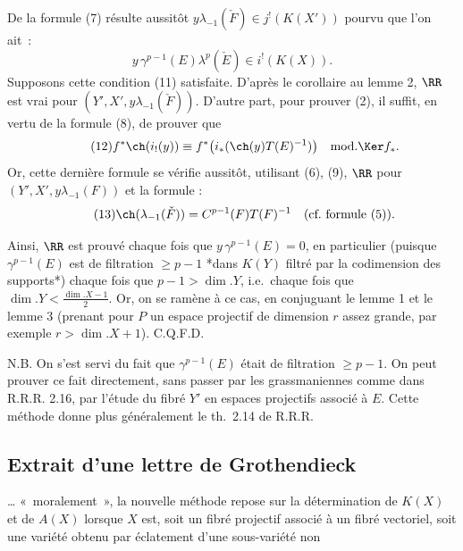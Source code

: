 De la
formule (7) résulte aussitôt \(y\lambda_{-1}(\check F)\in j^!(K(X'))\) pourvu que l'on ait~:
\begin{equation}\tag{11}
  y\,\gamma^{p-1}(E)\lambda^p(\check E)\in i^!(K(X)).
\end{equation}
Supposons cette condition (11) satisfaite. D'après le corollaire au lemme 2, \(\RR\) est vrai pour \((Y',X',y\lambda_{-1}(\check F))\). D'autre part, pour prouver (2), il suffit, en vertu de la formule (8), de prouver que
\begin{equation}\tag{12}
  f^*\ch(i_!(y))
  \equiv
  f^*\bigl(i_*(\ch(y)T(E)^{-1})\bigr)
  \quad\text{mod.}\Ker f_*.
\end{equation}
Or, cette dernière formule se vérifie aussitôt, utilisant (6), (9), \(\RR\) pour \((Y',X',y\lambda_{-1}(F))\) et la formule :
\begin{equation}\tag{13}
  \ch(\lambda_{-1}(\check F))=C^{p-1}(F)T(F)^{-1}\quad\text{(cf.\ formule (5)).}
\end{equation}

Ainsi, \(\RR\) est prouvé chaque fois que \(y\,\gamma^{p-1}(E)=0\), en particulier (puisque \(\gamma^{p-1}(E)\) est de filtration \(\geq p-1\) {*}dans \(K(Y)\) filtré par la codimension des supports{*}) chaque fois que \(p-1>\dim.Y\), i.e.\ chaque fois que \(\dim.Y<\frac{\dim.X-1}{2}\). Or, on se ramène à ce cas, en conjuguant le lemme 1 et le lemme 3 (prenant pour \(P\) un espace projectif de dimension \(r\) assez grande, par exemple \(r>\dim.X+1\)). C.Q.F.D.

N.B. On s'est servi du fait que \(\gamma^{p-1}(E)\) était de filtration \(\geq p-1\). On peut prouver ce fait directement, sans passer par les grassmaniennes comme dans \(\mathrm{R.R.R.}\) 2.16, par l'étude du fibré \(Y'\) en espaces projectifs associé à \(E\). Cette méthode donne plus généralement le th.\ 2.14 de \(\mathrm{R.R.R.}\)

\subsection*{Extrait d'une lettre de Grothendieck}
\dots{} «~moralement~», la nouvelle méthode repose sur la détermination de \(K(X)\) et de \(A(X)\) lorsque \(X\) est, soit un fibré projectif associé à un fibré vectoriel, soit une variété obtenu par éclatement d'une sous-variété non
